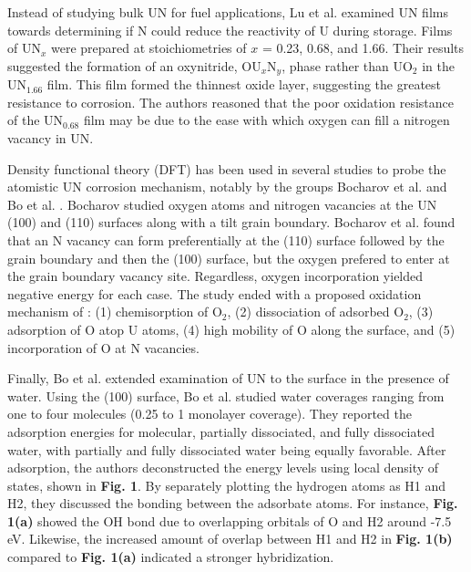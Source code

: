 \documentclass[11pt]{article}
\begin{document}
\begin{multicols}{2}
 Instead of studying bulk UN for fuel applications, Lu et al. \cite{Lu2016} examined UN films towards determining if N could reduce the reactivity of U during storage.  Films of UN$_{x}$ were prepared at stoichiometries of $x$ = 0.23, 0.68, and 1.66. Their results suggested the formation of an oxynitride, OU$_{x}$N$_{y}$, phase rather than UO$_{2}$ in the UN$_{1.66}$ film. This film formed the thinnest oxide layer, suggesting the greatest resistance to corrosion. The authors reasoned that the poor oxidation resistance of the UN$_{0.68}$ film may be due to the ease with which oxygen can fill a nitrogen vacancy in UN.
\par 
Density functional theory (DFT) has been used in several studies to probe the atomistic UN corrosion mechanism, notably by the groups Bocharov et al. \cite{Bocharov2013} and Bo et al. \cite{Bo2016}. Bocharov studied oxygen atoms and nitrogen vacancies at the UN (100) and (110) surfaces along with a tilt grain boundary. Bocharov et al. found that an N vacancy can form preferentially at the (110) surface followed by the grain boundary and then the (100) surface, but the oxygen prefered to enter at the grain boundary vacancy site. Regardless, oxygen incorporation yielded negative energy for each case. The study ended with a proposed oxidation mechanism of \cite{Bocharov2013}: 
	(1) chemisorption of O$_{2}$,
	(2) dissociation of adsorbed O$_{2}$,
	(3) adsorption of O atop U atoms,
	(4) high mobility of O along the surface, and
	(5) incorporation of O at N vacancies.
\par 
Finally, Bo et al. \cite{Bo2016} extended examination of UN to the surface in the presence of water. Using the (100) surface, Bo et al. studied water coverages ranging from one to four molecules (0.25 to 1 monolayer coverage). They reported the adsorption energies for molecular, partially dissociated, and fully dissociated water, with partially and fully dissociated water being equally favorable. After adsorption, the authors deconstructed the energy levels using local density of states, shown in \textbf{Fig. 1}. By separately plotting the hydrogen atoms as H1 and H2, they discussed the bonding between the adsorbate atoms. For instance, \textbf{Fig. 1(a)} showed the OH bond due to overlapping orbitals of O and H2 around -7.5 eV. Likewise, the increased amount of overlap between H1 and H2 in \textbf{Fig. 1(b)} compared to \textbf{Fig. 1(a)} indicated a stronger hybridization.
\begin{center}

\end{center}
\end{multicols}
\end{document}

